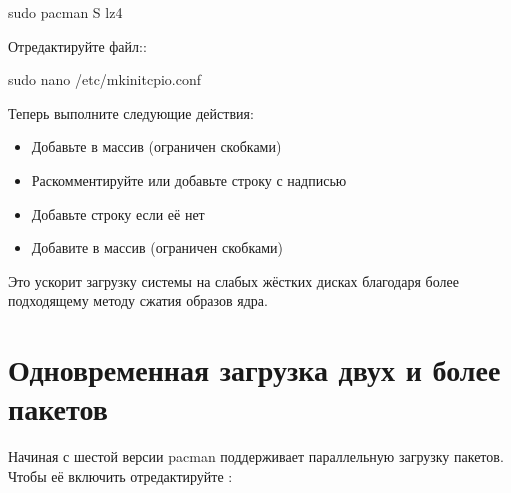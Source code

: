 \documentclass[letterpaper,10pt,russian,openany]{sphinxmanual}
\begin{document}
\begin{sphinxVerbatim}[commandchars=\\\{\}]
sudo pacman \PYGZhy{}S lz4
\end{sphinxVerbatim}

\sphinxAtStartPar
Отредактируйте файл::

\begin{sphinxVerbatim}[commandchars=\\\{\}]
sudo nano /etc/mkinitcpio.conf
\end{sphinxVerbatim}

\sphinxAtStartPar
Теперь выполните следующие действия:
\begin{itemize}
\item {} 
\sphinxAtStartPar
Добавьте  в массив  (ограничен скобками)

\item {} 
\sphinxAtStartPar
Раскомментируйте или добавьте строку с надписью 

\item {} 
\sphinxAtStartPar
Добавьте строку если её нет \sphinxhyphen{}  

\item {} 
\sphinxAtStartPar
Добавите  в массив  (ограничен скобками)

\end{itemize}

\sphinxAtStartPar
Это ускорит загрузку системы на слабых жёстких дисках благодаря более подходящему методу сжатия образов ядра.

\ignorespaces 

\section{Одновременная загрузка двух и более пакетов}
\label{\detokenize{source/generic-system-acceleration:parallel-downloading}}\label{\detokenize{source/generic-system-acceleration:index-10}}\label{\detokenize{source/generic-system-acceleration:id6}}
\sphinxAtStartPar
Начиная с шестой версии pacman поддерживает параллельную загрузку пакетов.
Чтобы её включить отредактируйте :
\end{document}
